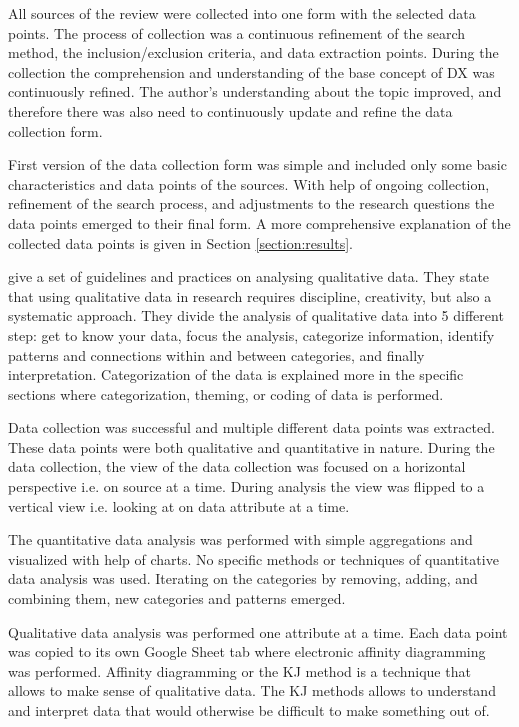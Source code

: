 \documentclass[english, 12pt, a4paper, sci, utf8, a-1b, online]{aaltothesis}
\newcounter{subsubsubsection}[subsubsection]
\begin{document}

All sources of the review were collected into one form with the selected data points. The process of collection was a continuous refinement of the search method, the inclusion/exclusion criteria, and data extraction points. During the collection the comprehension and understanding of the base concept of DX was continuously refined. The author's understanding about the topic improved, and therefore there was also need to continuously update and refine the data collection form.

First version of the data collection form was simple and included only some basic characteristics and data points of the sources. With help of ongoing collection, refinement of the search process, and adjustments to the research questions the data points emerged to their final form. A more comprehensive explanation of the collected data points is given in Section \ref{section:results}.


\textcite{analyzing-qualitative-data} give a set of guidelines and practices on analysing qualitative data. They state that using qualitative data in research requires discipline, creativity, but also a systematic approach. They divide the analysis of qualitative data into 5 different step: get to know your data, focus the analysis, categorize information, identify patterns and connections within and between categories, and finally interpretation. Categorization of the data is explained more in the specific sections where categorization, theming, or coding of data is performed.

Data collection was successful and multiple different data points was extracted. These data points were both qualitative and quantitative in nature. During the data collection, the view of the data collection was focused on a horizontal perspective i.e. on source at a time. During analysis the view was flipped to a vertical view i.e. looking at on data attribute at a time.

The quantitative data analysis was performed with simple aggregations and visualized with help of charts. No specific methods or techniques of quantitative data analysis was used. Iterating on the categories by removing, adding, and combining them, new categories and patterns emerged.

Qualitative data analysis was performed one attribute at a time. Each data point was copied to its own Google Sheet tab where electronic affinity diagramming was performed. Affinity diagramming or the KJ method \parencite{scupin1997kj} is a technique that allows to make sense of qualitative data. The KJ methods allows to understand and interpret data that would otherwise be difficult to make something out of.
\end{document}
